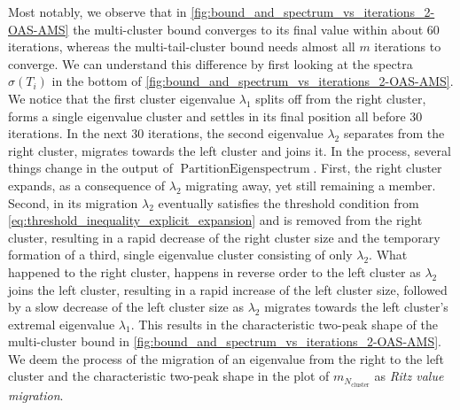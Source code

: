 Most notably, we observe that in \cref{fig:bound_and_spectrum_vs_iterations_2-OAS-AMS} the multi-cluster bound converges to its final value within about 60 iterations, whereas the multi-tail-cluster bound needs almost all $m$ iterations to converge. We can understand this difference by first looking at the spectra $\sigma(T_i)$ in the bottom of \cref{fig:bound_and_spectrum_vs_iterations_2-OAS-AMS}. We notice that the first cluster eigenvalue $\lambda_1$ splits off from the right cluster, forms a single eigenvalue cluster and settles in its final position all before 30 iterations. In the next 30 iterations, the second eigenvalue $\lambda_2$ separates from the right cluster, migrates towards the left cluster and joins it. In the process, several things change in the output of $\operatorname{PartitionEigenspectrum}$. First, the right cluster expands, as a consequence of $\lambda_2$ migrating away, yet still remaining a member. Second, in its migration $\lambda_2$ eventually satisfies the threshold condition from \cref{eq:threshold_inequality_explicit_expansion} and is removed from the right cluster, resulting in a rapid decrease of the right cluster size and the temporary formation of a third, single eigenvalue cluster consisting of only $\lambda_2$. What happened to the right cluster, happens in reverse order to the left cluster as $\lambda_2$ joins the left cluster, resulting in a rapid increase of the left cluster size, followed by a slow decrease of the left cluster size as $\lambda_2$ migrates towards the left cluster's extremal eigenvalue $\lambda_1$. This results in the characteristic two-peak shape of the multi-cluster bound in \cref{fig:bound_and_spectrum_vs_iterations_2-OAS-AMS}. We deem the process of the migration of an eigenvalue from the right to the left cluster and the characteristic two-peak shape in the plot of $m_{N_{\text{cluster}}}$ as \textit{Ritz value migration}. 

